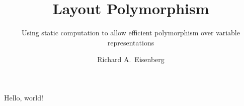\documentclass[10pt,sigplan,screen,dvipsnames]{acmart}
\title{Layout Polymorphism}
\subtitle{Using static computation to allow efficient polymorphism over variable representations}
\author{Richard A.~Eisenberg}
\begin{document}
Hello, world!

\ottall
\end{document}
